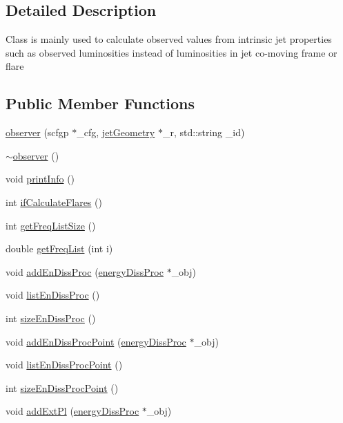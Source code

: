 \subsection{Detailed Description}
Class is mainly used to calculate observed values from intrinsic jet properties such as observed luminosities instead of luminosities in jet co-\/moving frame or flare \subsection*{Public Member Functions}
\begin{DoxyCompactItemize}
\item 
\hyperlink{classobserver_a42314af9846ce37a6cdadd7a027eed12}{observer} (scfgp $\ast$\-\_\-cfg, \hyperlink{classjetGeometry}{jet\-Geometry} $\ast$\-\_\-r, std\-::string \-\_\-id)
\item 
\hyperlink{classobserver_acb64c4c8de3e36b5cce282dc139e602c}{$\sim$observer} ()
\item 
void \hyperlink{classobserver_a1fbeb6a33647dfadbb1ca9c0d64953bb}{print\-Info} ()
\item 
int \hyperlink{classobserver_aa28bd51f0a5bda86584ae35cd32603d6}{if\-Calculate\-Flares} ()
\item 
int \hyperlink{classobserver_af12e74dd21611778bc53e1766cbd4349}{get\-Freq\-List\-Size} ()
\item 
double \hyperlink{classobserver_a36e7c21680cd2ba038fb7cf3e6dfb77b}{get\-Freq\-List} (int i)
\item 
void \hyperlink{classobserver_a0e5aaaf485e52230ade3ebc034956608}{add\-En\-Diss\-Proc} (\hyperlink{classenergyDissProc}{energy\-Diss\-Proc} $\ast$\-\_\-obj)
\item 
void \hyperlink{classobserver_a0bfece68d09337e339436326fdf2eabc}{list\-En\-Diss\-Proc} ()
\item 
int \hyperlink{classobserver_a3455cd549f8a75cbe2f5c068ae88ec79}{size\-En\-Diss\-Proc} ()
\item 
void \hyperlink{classobserver_a9e6f78fade71b521003ee502c0eafaab}{add\-En\-Diss\-Proc\-Point} (\hyperlink{classenergyDissProc}{energy\-Diss\-Proc} $\ast$\-\_\-obj)
\item 
void \hyperlink{classobserver_ac92a23cc40135eff9c9d443becd9dfa2}{list\-En\-Diss\-Proc\-Point} ()
\item 
int \hyperlink{classobserver_ade865c5881df7e3fc884b50ca812c52e}{size\-En\-Diss\-Proc\-Point} ()
\item 
void \hyperlink{classobserver_a7755eb84eb5fc1bb7a5e84463034bf18}{add\-Ext\-Pl} (\hyperlink{classenergyDissProc}{energy\-Diss\-Proc} $\ast$\-\_\-obj)

\end{DoxyCompactItemize}
